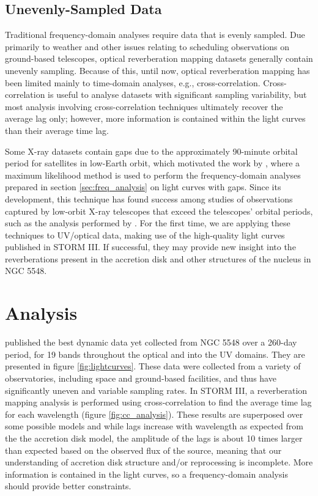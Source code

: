 \documentclass[11pt,letterpaper]{article}
\begin{document}
	\subsection{Unevenly-Sampled Data}
    \label{sec:uneven_data}

    Traditional frequency-domain analyses require data that is evenly sampled. Due primarily to weather and other issues relating to scheduling observations on ground-based telescopes, optical reverberation mapping datasets generally contain unevenly sampling. Because of this, until now, optical reverberation mapping has been limited mainly to time-domain analyses, e.g., cross-correlation. Cross-correlation is useful to analyse datasets with significant sampling variability, but most analysis involving cross-correlation techniques ultimately recover the average lag only; however, more information is contained within the light curves than their average time lag.

    Some X-ray datasets contain gaps due to the approximately 90-minute orbital period for satellites in low-Earth orbit, which motivated the work by \cite{2013ApJ...777...24Z}, where a maximum likelihood method is used to perform the frequency-domain analyses prepared in section \ref{sec:freq_analysis} on light curves with gaps. Since its development, this technique has found success among studies of observations captured by low-orbit X-ray telescopes that exceed the telescopes' orbital periods, such as the analysis performed by \cite{2016Natur.535..388K}. For the first time, we are applying these techniques to UV/optical data, making use of the high-quality light curves published in STORM III. If successful, they may provide new insight into the reverberations present in the accretion disk and other structures of the nucleus in NGC 5548.

\section{Analysis}
\label{analysis}
\cite{2016ApJ...821...56F} published the best dynamic data yet collected from NGC 5548 over a 260-day period, for 19 bands throughout the optical and into the UV domains. They are presented in figure \ref{fig:lightcurves}. These data were collected from a variety of observatories, including space and ground-based facilities, and thus have significantly uneven and variable sampling rates. In STORM III, a reverberation mapping analysis is performed using cross-correlation to find the average time lag for each wavelength (figure \ref{fig:cc_analysis}). These results are superposed over some possible models and while lags increase with wavelength as expected from the the accretion disk model, the amplitude of the lags is about 10 times larger than expected based on the observed flux of the source, meaning that our understanding of accretion disk structure and/or reprocessing is incomplete. More information is contained in the light curves, so a frequency-domain analysis should provide better constraints.
\end{document}

